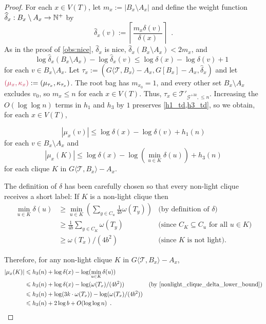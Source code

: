 \documentclass{patmorin}
\makeatletter
\let\eqref\cref
\renewcommand{\ge}{\geqslant}
\renewcommand{\le}{\leqslant}
\def\mathcolor#1#{\@mathcolor{#1}}
\def\@mathcolor#1#2#3{%
  \protect\leavevmode
  \begingroup
    \color#1{#2}#3%
  \endgroup
}
\newcommand{\mathdefin}[1]{\mathcolor{brightmaroon}{#1}}
\newcommand{\torso}[2]{{#1}\langle{#2}\rangle}
\newcommand{\Oh}{O}
\newcommand{\calG}{\mathcal{G}}
\newcommand{\calT}{\mathcal{T}}
\makeatother
\begin{document}
\begin{proof}
  For each $x\in V(T)$, let $m_x:=|B_x\setminus A_x|$ and define the weight function $\widehat\delta_x:B_x\setminus A_x\to\mathbb{N}^+$ by
  \[
    \widehat\delta_x(v):=\left\lceil\frac{m_x\delta(v)}{\delta(x)}\right\rceil\enspace.
  \]
  As in the proof of \cref{obs:nice}, $\widehat\delta_x$ is nice, $\widehat\delta_x(B_x\setminus A_x)<2m_x$, and
  \[
    \log\widehat\delta_x(B_x\setminus A_x)-\log\widehat\delta_x(v)
    \le\log\delta(x)-\log\delta(v)+1\enspace
  \]
  for each $v\in B_x\setminus A_x$.
  Let $\tau_x:=(\torso{G}{\calT,B_x}-A_x,G[B_x]-A_x,\widehat\delta_x)$ and let $\mathdefin{(\mu_x,\kappa_x)}:=(\mu_{\tau_x},\kappa_{\tau_x})$. The root bag has $m_{x_0}=1$, and every other set $B_x\setminus A_x$ excludes $v_0$, so $m_x\le n$ for each $x\in V(T)$. Thus, $\tau_x\in\calT'_{\calG^{+3k},\le n}$.  Increasing the $\Oh(\log\log n)$ terms in $h_1$ and $h_3$ by $1$ preserves \cref{h1_td,h3_td}, so we obtain, for each $x\in V(T)$,

  \begin{equation}
    |\mu_x(v)|\le \log\delta(x)-\log\delta(v) + h_1(n)
      \label{mu_x_v_upper_bound}
  \end{equation}
  for each $v\in B_x\setminus A_x$ and 
  \begin{equation}
    |\mu_x(K)|\le \log\delta(x)-\log(\min_{u\in K} \delta(u)) + h_3(n)
      \label{mu_x_K_upper_bound}
  \end{equation}
  for each clique $K$ in $\torso{G}{\calT,B_x}-A_x$.  
  
  The definition of $\delta$ has been carefully chosen so that every non-light clique receives a short label: If $K$ is a non-light clique then 
  \begin{align}
    \min_{u\in K} \delta(u) 
    & \ge \min_{u\in K}\left(\sum_{y\in C_u}\tfrac{1}{4b}\omega(T_y) \right) 
    & \text{(by definition of $\delta$)} \nonumber \\
    & \ge \tfrac{1}{4b}\sum_{y\in C_K} \omega(T_y)  
    & \text{(since $C_K\subseteq C_u$ for all $u\in K$)} \nonumber \\
    & \ge \omega(T_x)/(4b^2) 
    & \text{(since $K$ is not light).} \label{nonlight_clique_delta_lower_bound}
  \end{align}

  Therefore, for any non-light clique $K$ in $\torso{G}{\calT,B_x}-A_x$,  
  \begin{align}
    |\mu_x(K)|
    & \le h_3(n) + \log\delta(x)-\log(\min_{u\in K} \delta(u)) \nonumber \\
    & \le h_3(n) + \log\delta(x)-\log(\omega(T_x)/(4b^2)) & \text{(by \eqref{nonlight_clique_delta_lower_bound})} \nonumber \\
    & \le h_3(n) + \log(3k\cdot\omega(T_x))-\log(\omega(T_x)/(4b^2)) \nonumber \\
    & \le h_3(n) + 2\log b  + \Oh(\log\log n) \enspace .
      \label{mu_x_K_light_upper_bound}
  \end{align}


\end{proof}
\end{document}
